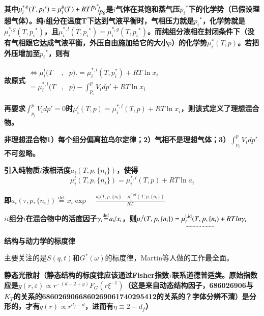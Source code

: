 \documentclass{article} %
\begin{document}
{\bf 其中$\mu _{i}^{*,g} (T,p_{i} {}^{*} )=\mu _{i}^{\theta } (T)+RT{\raise0.7ex\hbox{$ p_{i} {}^{*}  $}\!\mathord{\left/ {\vphantom {p_{i} {}^{*}  p_{\theta } }} \right. \kern-\nulldelimiterspace}\!\lower0.7ex\hbox{$ p_{\theta }  $}} $是$i$气体在其饱和蒸气压$p_{i} {}^{*} $下的化学势（已假设理想气体）。纯$i$组分在温度T下达到气液平衡时，气相压力就是$p_{i} {}^{*} $，化学势就是$\mu _{i}^{*,g} (T,p_{i} {}^{*} )$，且$\mu _{i}^{*,l} (T,p_{i} {}^{*} )=\mu _{i}^{*,g} (T,p_{i} {}^{*} )$。而纯组分液相在封闭条件下（没有气相跟它达成气液平衡，外压自由施加给它的大小$p$）的化学势$\mu _{i}^{*} (T,p)$。若把外压增加至$p_{i} {}^{*} $，则有}

\noindent 
{\bf }

\noindent 
{\bf 故原式$\begin{array}{rcl} {\Leftrightarrow \mu {}_{i}^{l} (T} & {,} & {p).=\mu _{i}^{*,l} (T,p_{i}^{*} )+RT\ln x_{i} } \\ {=\mu {}_{i}^{*,l} (T} & {,} & {p)-\int _{p_{i} }^{p}V_{i}  dp'+RT\ln x_{i} } \end{array}$ }

\noindent 
{\bf 再要求$\int _{p_{i} }^{p}V_{i}  dp'=0$时$\mu _{i}^{l} (T,p)=\mu _{i}^{*,l} (T,p)+RT\ln x_{i} $，则该式定义了理想混合物。}


{\bf  非理想混合物1）每个组分偏离拉乌尔定律；2）气相不是理想气体；3）$\int _{p_{i} }^{p}V_{i}  dp'$不可忽略。}


{\bf  引入纯物质$i$液相活度$a_{i} \left(T,p,\{ n_{i} \} \right)$，使得
\[\mu _{i}^{l} (T,p,\{ n_{i} \} )=\mu _{i}^{*,l} (T,p)+RT\ln a_{i} \] }

{\bf 即$a_{i} (\tau ,p,\{ n_{i} \} ){\mathop{=}\limits^{\det }} x_{i} \exp \quad \frac{u_{i}^{l} (T,p,\{ n_{i} \} -\mu _{i}^{l,id} (T,p,\{ n_{i} \} )}{RT} $}

\noindent 
{\bf $i$$i$组分$i$在混合物中的活度因子$\gamma _{i} {\mathop{=}\limits^{{\rm def}}} {a_{i} \mathord{\left/ {\vphantom {a_{i}  x_{i} }} \right. \kern-\nulldelimiterspace} x_{i} } $，则$\mu _{i} {}^{l} (T,p,\{ n_{i} \} )={\mathop{\mu _{i}^{{\rm l,id}} (T,p,\{ n_{i} )}\limits_{\mathrm{\sim \sim \sim \sim \sim \sim \sim \sim \sim }}} +RTln\gamma _{i} $ }

\noindent \eject 

\noindent \textbf{结构与动力学的标度律}

\noindent 主要关注的是$S(q,t)$和$G^{*} \left(\omega \right)$的标度律，Martin等人做的工作最全面。


{\bf  静态光散射（静态结构的标度律应该通过Fisher指数$\tau $联系道德普适类。原始指数应是$g(r,\varepsilon )\propto r^{-(d-2+y)} F_{G} (r\xi ^{-1} )$（这是来自动态结构因子，686026906与$K_{T} $的关系的6860269066860269061740295412的关系的？字体分辨不清）是分形的，才有$q(r)\propto r^{d_{f} -d} $，进而有$\eta \equiv 2-d_{f} $）}
\end{document}
